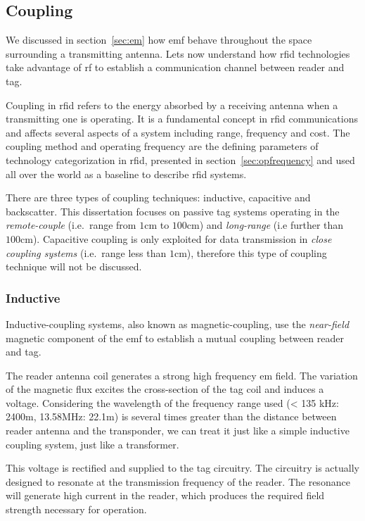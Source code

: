 \subsection{Coupling}

We discussed in section~\ref{sec:em} how \ac{emf} behave throughout the space surrounding a transmitting antenna. Lets now understand how \ac{rfid} technologies take advantage of \acl{rf} to establish a communication channel between reader and tag.

Coupling in \ac{rfid} refers to the energy absorbed by a receiving antenna when a transmitting one is operating. 
It is a fundamental concept in \ac{rfid} communications and affects several aspects of a system including range, frequency and cost.
The coupling method and operating frequency are the defining parameters of technology categorization in \ac{rfid}, presented in section~\ref{sec:opfrequency} and used all over the world as a baseline to describe \ac{rfid} systems.

There are three types of coupling techniques: inductive, capacitive and backscatter. 
This dissertation focuses on passive tag systems operating in the \emph{remote-couple} (i.e.\ range from $1$cm to $100$cm) and \emph{long-range} (i.e further than $100$cm).
Capacitive coupling is only exploited for data transmission in \emph{close coupling systems} (i.e.\ range less than $1$cm), therefore this type of coupling technique will not be discussed.

\subsubsection{Inductive}

Inductive-coupling systems, also known as magnetic-coupling, use the \emph{near-field} magnetic component of the \ac{emf} to establish a mutual coupling between reader and tag.

The reader antenna coil generates a strong high frequency \ac{em} field. The variation of the magnetic flux excites the cross-section of the tag coil and induces a voltage.
Considering the wavelength of the frequency range used (< 135 kHz: 2400m, 13.58MHz: 22.1m) is several times greater than the distance between reader antenna and the transponder, we can treat it just like a simple inductive coupling system, just like a transformer.

This voltage is rectified and supplied to the tag circuitry.
The circuitry is actually designed to resonate at the transmission frequency of the reader. The resonance will generate high current in the reader, which produces the required field strength necessary for operation.

